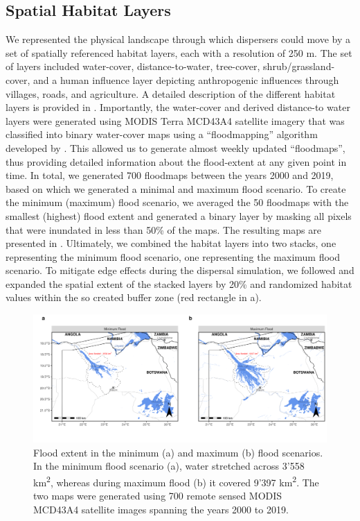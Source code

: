 \documentclass[abstract=on,10pt,a4paper,bibliography=totocnumbered]{article}
\begin{document}
\subsection{Spatial Habitat Layers}
We represented the physical landscape through which dispersers could move by a
set of spatially referenced habitat layers, each with a resolution of 250 m. The
set of layers included water-cover, distance-to-water, tree-cover,
shrub/grassland-cover, and a human influence layer depicting anthropogenic
influences through villages, roads, and agriculture. A detailed description of
the different habitat layers is provided in \citep{Hofmann.2021}. Importantly,
the water-cover and derived distance-to water layers were generated using MODIS
Terra MCD43A4 satellite imagery that was classified into binary water-cover maps
using a ``floodmapping'' algorithm developed by \citep{Wolski.2017}. This
allowed us to generate almost weekly updated ``floodmaps'', thus providing
detailed information about the flood-extent at any given point in time. In
total, we generated 700 floodmaps between the years 2000 and 2019, based on
which we generated a minimal and maximum flood scenario. To create the minimum
(maximum) flood scenario, we averaged the 50 floodmaps with the smallest
(highest) flood extent and generated a binary layer by masking all pixels that
were inundated in less than 50\% of the maps. The resulting maps are presented
in . Ultimately, we combined the habitat layers into two
stacks, one representing the minimum flood scenario, one representing the
maximum flood scenario. To mitigate edge effects during the dispersal
simulation, we followed \cite{Koen.2010} and expanded the spatial extent of the
stacked layers by 20\% and randomized habitat values within the so created
buffer zone (red rectangle in  a).

\begin{figure}
  \begin{center}
  \includegraphics[width = \textwidth]{99_FloodExtent.png}
  \caption{Flood extent in the minimum (a) and maximum (b) flood scenarios. In
  the minimum flood scenario (a), water stretched across 3'558
  km\textsuperscript{2}, whereas during maximum flood (b) it covered 9'397
  km\textsuperscript{2}. The two maps were generated using 700 remote sensed
  MODIS MCD43A4 satellite images spanning the years 2000 to 2019.}
  \label{FloodExtent}
  \end{center}
\end{figure}
\end{document}
